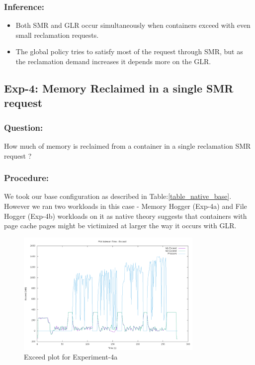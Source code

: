 	\subsubsection{Inference:}
	  \begin{itemize}
	    \item Both SMR and GLR occur simultaneously when containers exceed with even small reclamation requests. 
	    \item The global policy tries to satisfy most of the request through SMR, but as the reclamation demand increases it 
depends more on  the GLR.
	  \end{itemize}
  
    \subsection{Exp-4: Memory Reclaimed in a single SMR request}
	
	\subsubsection{Question:} 
 	  How much of memory is reclaimed from a container in a single reclamation SMR request ?
	
	\subsubsection{Procedure:}
	  We took our base configuration as described in Table:\ref{table_native_base}. However we ran two workloads in this case - Memory 
Hogger (Exp-4a) and File Hogger (Exp-4b) workloads on it as native theory suggests that containers with page cache pages might be 
victimized at larger the way it occurs with GLR.	
	
	\begin{figure}
	  \centering
	  \includegraphics[width=0.8\textwidth]{images/experimentation/workload/1/Exceed.png}
	  \caption{Exceed plot for Experiment-4a}
	  \label{img_workload_1_exceed}
	\end{figure}
	
